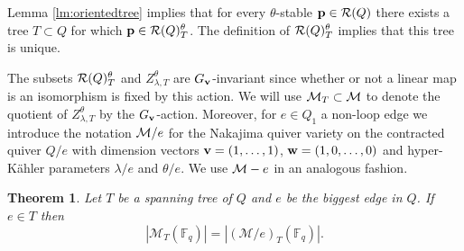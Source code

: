 \documentclass{amsart}
\newtheorem{thm}{Theorem}[section]
\theoremstyle{definition}
\begin{document}
Lemma \ref{lm:orientedtree} implies that for every $\theta$-stable $\mathbf{p} \in \mathcal{R}(Q)$ there exists a tree $T \subset Q$ for which $\mathbf{p} \in \mathcal{R}(Q)_T^\theta$.
The definition of $\mathcal{R}(Q)_T^\theta$ implies that this tree is unique.

The subsets $\mathcal{R}(Q)_T^\theta$ and $Z_{\lambda,T}^\theta$ are $G_{\mathbf{v}}$-invariant since whether or not a linear map is an isomorphism is fixed by this action.
We will use $\mathcal{M}_T \subset \mathcal{M}$ to denote the quotient of $Z_{\lambda,T}^\theta$ by the $G_{\mathbf{v}}$-action.
Moreover, for $e\in Q_1$ a non-loop edge we introduce the notation $\mathcal{M}/e$ for the Nakajima quiver variety on the contracted quiver $Q/e$ with dimension vectors $\mathbf{v}= (1,\ldots,1)$, $\mathbf{w}= (1,0,\ldots,0)$ and hyper-K\"ahler parameters $\lambda/e$ and $\theta/e$.
We use $\mathcal{M}-e$ in an analogous fashion.

\begin{thm}\label{thm:contract}
Let $T$ be a spanning tree of $Q$ and $e$ be the biggest edge in $Q$. 
If $e \in T$ then $$|\mathcal{M}_T(\mathbb{F}_q)| = |(\mathcal{M}/e)_T(\mathbb{F}_q)|.$$
\end{thm}
\end{document}
